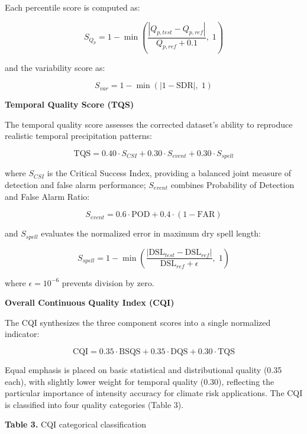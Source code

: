 \documentclass[remotesensing,article,submit,pdftex,moreauthors]{Definitions/mdpi}
\begin{document}
Each percentile score is computed as:

\[S_{Q_p} = 1 - \min\left(\frac{|Q_{p,test} - Q_{p,ref}|}{Q_{p,ref} + 0.1}, \; 1\right)\]

and the variability score as:

\[S_{var} = 1 - \min(|1 - \text{SDR}|, \; 1)\]

\textbf{Temporal Quality Score (TQS)}

The temporal quality score assesses the corrected dataset's ability to
reproduce realistic temporal precipitation patterns:

\[\text{TQS} = 0.40 \cdot S_{CSI} + 0.30 \cdot S_{event} + 0.30 \cdot S_{spell}\]

where \(S_{CSI}\) is the Critical Success Index, providing a balanced
joint measure of detection and false alarm performance; \(S_{event}\)
combines Probability of Detection and False Alarm Ratio:

\[S_{event} = 0.6 \cdot \text{POD} + 0.4 \cdot (1 - \text{FAR})\]

and \(S_{spell}\) evaluates the normalized error in maximum dry spell
length:

\[S_{spell} = 1 - \min\left(\frac{|\text{DSL}_{test} - \text{DSL}_{ref}|}{\text{DSL}_{ref} + \epsilon}, \; 1\right)\]

where \(\epsilon = 10^{-6}\) prevents division by zero.

\textbf{Overall Continuous Quality Index (CQI)}

The CQI synthesizes the three component scores into a single normalized
indicator:

\[\text{CQI} = 0.35 \cdot \text{BSQS} + 0.35 \cdot \text{DQS} + 0.30 \cdot \text{TQS}\]

Equal emphasis is placed on basic statistical and distributional quality
(0.35 each), with slightly lower weight for temporal quality (0.30),
reflecting the particular importance of intensity accuracy for climate
risk applications. The CQI is classified into four quality categories
(Table 3).

\textbf{Table 3.} CQI categorical classification
\end{document}
